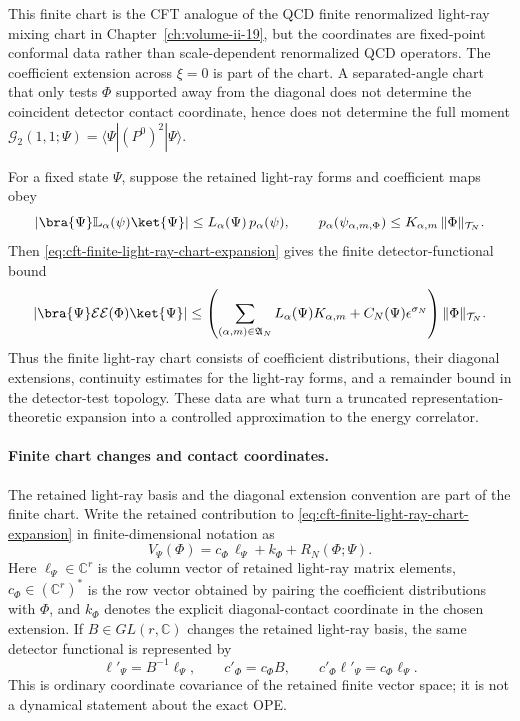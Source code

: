 This finite chart is the CFT analogue of the QCD finite renormalized
light-ray mixing chart in
Chapter~\ref{ch:volume-ii-19}, but the
coordinates are fixed-point conformal data rather than scale-dependent
renormalized QCD operators.  The coefficient extension across \(\xi=0\) is
part of the chart.  A separated-angle chart that only tests
\(\Phi\) supported away from the diagonal does not determine the coincident
detector contact coordinate, hence does not determine the full moment
\(\mathcal G_2(1,1;\Psi)=\langle\Psi|(P^0)^2|\Psi\rangle\).

For a fixed state \(\Psi\), suppose the retained light-ray forms and
coefficient maps obey
\begin{equation}
  \left|
    \bra{\Psi}\mathbb L_\alpha(\psi)\ket{\Psi}
  \right|
  \leq
  L_{\alpha}(\Psi)\,p_\alpha(\psi),
  \qquad
  p_\alpha(\psi_{\alpha,m,\Phi})
  \leq
  K_{\alpha,m}\,\|\Phi\|_{\mathcal T_N}.
  \label{eq:cft-finite-light-ray-chart-continuity}
\end{equation}
Then \eqref{eq:cft-finite-light-ray-chart-expansion} gives the finite
detector-functional bound
\begin{equation}
  \left|
    \bra{\Psi}\mathcal E\mathcal E(\Phi)\ket{\Psi}
  \right|
  \leq
  \left(
    \sum_{(\alpha,m)\in\mathfrak A_N}
    L_\alpha(\Psi)K_{\alpha,m}
    +
    C_N(\Psi)\epsilon^{\sigma_N}
  \right)
  \|\Phi\|_{\mathcal T_N}.
  \label{eq:cft-finite-light-ray-chart-detector-bound}
\end{equation}
Thus the finite light-ray chart consists of coefficient distributions, their
diagonal extensions, continuity estimates for the light-ray forms, and a
remainder bound in the detector-test topology.  These data are what turn a
truncated representation-theoretic expansion into a controlled approximation
to the energy correlator.

\paragraph{Finite chart changes and contact coordinates.}
The retained light-ray basis and the diagonal extension convention are part of
the finite chart.  Write the retained contribution to
\eqref{eq:cft-finite-light-ray-chart-expansion} in finite-dimensional notation
as
\[
  V_\Psi(\Phi)
  =
  c_\Phi\,\ell_\Psi+k_\Phi+R_N(\Phi;\Psi).
\]
Here \(\ell_\Psi\in\mathbb C^r\) is the column vector of retained light-ray
matrix elements, \(c_\Phi\in(\mathbb C^r)^\ast\) is the row vector obtained by
pairing the coefficient distributions with \(\Phi\), and \(k_\Phi\) denotes
the explicit diagonal-contact coordinate in the chosen extension.  If
\(B\in GL(r,\mathbb C)\) changes the retained light-ray basis, the same
detector functional is represented by
\begin{equation}
  \ell'_\Psi=B^{-1}\ell_\Psi,
  \qquad
  c'_\Phi=c_\Phi B,
  \qquad
  c'_\Phi\ell'_\Psi=c_\Phi\ell_\Psi .
  \label{eq:cft-light-ray-chart-basis-covariance}
\end{equation}
This is ordinary coordinate covariance of the retained finite vector space;
it is not a dynamical statement about the exact OPE.

